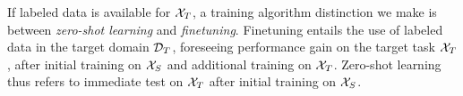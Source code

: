 If labeled data is available for $\mathcal{X}_T$, a training algorithm distinction we make is between \emph{zero-shot learning} and \emph{finetuning}. Finetuning entails the use of labeled data in the target domain $\mathcal{D}_T$, foreseeing performance gain on the target task $\mathcal{X}_T$, after initial training on $\mathcal{X}_S$ and additional training on $\mathcal{X}_T$. Zero-shot learning thus refers to immediate test on $\mathcal{X}_T$ after initial training on $\mathcal{X}_S$.